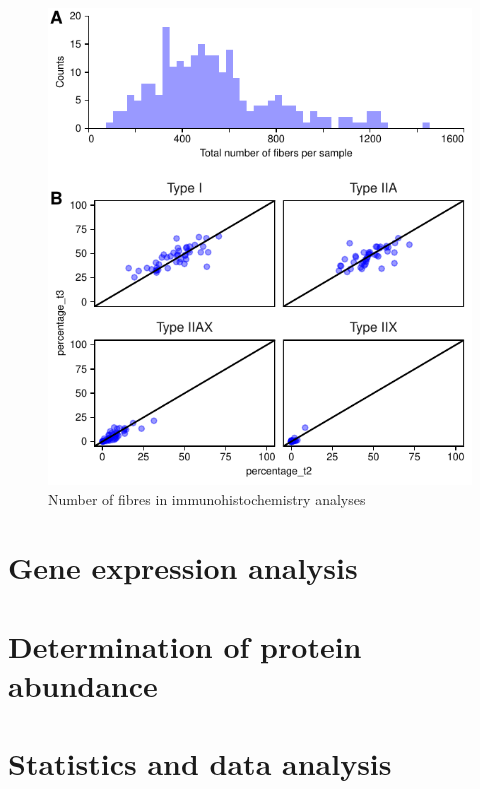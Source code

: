 \documentclass[twoside,10pt]{gihclass} %
\begin{document}
\begin{figure}

{\centering \includegraphics{thesis_files/figure-latex/immuno-methods-1} 

}

\caption[Fiber counts]{Number of fibres in immunohistochemistry analyses}\label{fig:immuno-methods}
\end{figure}
\hypertarget{gene-expression-analysis}{%
\section{Gene expression analysis}\label{gene-expression-analysis}}

\hypertarget{determination-of-protein-abundance}{%
\section{Determination of protein abundance}\label{determination-of-protein-abundance}}

\hypertarget{statistics-and-data-analysis}{%
\section{Statistics and data analysis}\label{statistics-and-data-analysis}}
\end{document}
